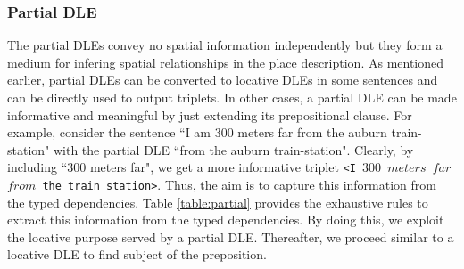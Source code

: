 \documentclass{acm_proc_article-sp}
\begin{document}
\subsubsection*{Partial DLE}
The partial DLEs convey no spatial information independently but they form a medium for infering spatial relationships in the place description. As mentioned earlier, partial DLEs can be converted to locative DLEs in some sentences and can be directly used to output triplets. In other cases, a partial DLE can be made informative and meaningful by just extending its prepositional clause. For example, consider the sentence ``I am 300 meters far from the auburn train-station" with the partial DLE ``from the auburn train-station". Clearly, by including ``300 meters far", we get a more informative triplet \texttt{<I $300$ $meters$ $far$ $from$ the train station>}. Thus, the aim is to capture this information from the typed dependencies. Table \ref{table:partial} provides the exhaustive rules to extract this information from the typed dependencies. By doing this, we exploit the locative purpose served by a partial DLE. Thereafter, we proceed similar to a locative DLE to find subject of the preposition.



\end{document}
